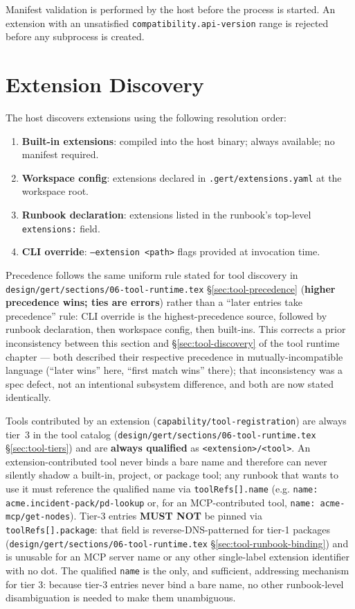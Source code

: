 Manifest validation is performed by the host before the process is started.
An extension with an unsatisfied \texttt{compatibility.api-version} range is
rejected before any subprocess is created.

\section{Extension Discovery}
\label{sec:ext-discovery}

The host discovers extensions using the following resolution order:

\begin{enumerate}
  \item \textbf{Built-in extensions}: compiled into the host binary; always
        available; no manifest required.
  \item \textbf{Workspace config}: extensions declared in
        \texttt{.gert/extensions.yaml} at the workspace root.
  \item \textbf{Runbook declaration}: extensions listed in the runbook's
        top-level \texttt{extensions:} field.
  \item \textbf{CLI override}: \texttt{--extension <path>} flags provided at
        invocation time.
\end{enumerate}

Precedence follows the same uniform rule stated for tool discovery in
\texttt{design/gert/sections/06-tool-runtime.tex}
\S\ref{sec:tool-precedence} (\textbf{higher precedence wins; ties are
errors}) rather than a ``later entries take precedence'' rule: CLI override
is the highest-precedence source, followed by runbook declaration, then
workspace config, then built-ins. This corrects a prior inconsistency
between this section and \S\ref{sec:tool-discovery} of the tool runtime
chapter --- both described their respective precedence in
mutually-incompatible language (``later wins'' here,
``first match wins'' there); that inconsistency was a spec defect, not an
intentional subsystem difference, and both are now stated identically.

Tools contributed by an extension (\texttt{capability/tool-registration}) are
always tier~3 in the tool catalog (\texttt{design/gert/sections/06-tool-runtime.tex}
\S\ref{sec:tool-tiers}) and are \textbf{always qualified} as
\texttt{<extension>/<tool>}. An extension-contributed tool never binds a
bare name and therefore can never silently shadow a built-in, project, or
package tool; any runbook that wants to use it must reference the qualified
name via \texttt{toolRefs[].name} (e.g. \texttt{name: acme.incident-pack/pd-lookup}
or, for an MCP-contributed tool, \texttt{name: acme-mcp/get-nodes}). Tier-3
entries \textbf{MUST NOT} be pinned via \texttt{toolRefs[].package}: that
field is reverse-DNS-patterned for tier-1 packages
(\texttt{design/gert/sections/06-tool-runtime.tex}
\S\ref{sec:tool-runbook-binding}) and is unusable for an MCP server name or
any other single-label extension identifier with no dot. The qualified
\texttt{name} is the only, and sufficient, addressing mechanism for tier 3:
because tier-3 entries never bind a bare name, no other runbook-level
disambiguation is needed to make them unambiguous.

